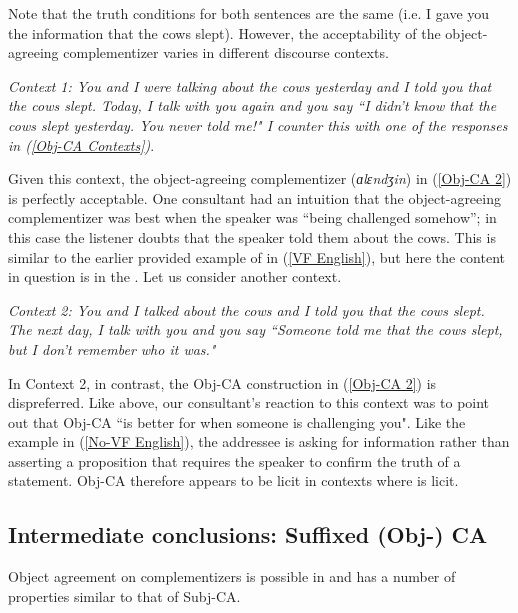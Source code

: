 \documentclass[output=paper
,newtxmath
,modfonts
,nonflat]{langsci/langscibook}
\begin{document}
\noindent Note that the truth conditions for both sentences are the same (i.e. I gave you the information that the cows slept). However, the acceptability of the object-agreeing complementizer varies in different discourse contexts.

\ea %
\textit{Context 1: You and I were talking about the cows yesterday and I told you that the cows slept. Today, I talk with you again and you say ``I didn't know that the cows slept yesterday. You never told me!" I counter this with one of the responses in (\ref{Obj-CA Contexts})}.
\z

\noindent Given this context, the object-agreeing complementizer (\textit{ɑlɛndʒin}) in (\ref{Obj-CA 2}) is perfectly acceptable. One consultant had an intuition that the object-agreeing complementizer was best when the speaker was ``being challenged somehow''; in this case the listener doubts that the speaker told them about the cows. This is similar to the earlier provided example of  in (\ref{VF English}), but here the content in question is in the . Let us consider another context.

\ea %
\textit{Context 2: You and I talked about the cows and I told you that the cows slept. The next day, I talk with you and you say ``Someone told me that the cows slept, but I don't remember who it was."}
\z

\noindent In Context 2, in contrast, the Obj-CA construction in (\ref{Obj-CA 2}) is dispreferred. Like above, our consultant's reaction to this context was to point out that Obj-CA ``is better for when someone is challenging you". Like the example in (\ref{No-VF English}), the addressee is asking for information rather than asserting a proposition that requires the speaker to confirm the truth of a statement. Obj-CA therefore appears to be licit in contexts where  is licit.


\subsection{Intermediate conclusions: Suffixed (Obj-) CA}

Object agreement on complementizers is possible in  and has a number of properties similar to that of Subj-CA.
\end{document}
